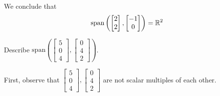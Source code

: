 \documentclass{ximera}
\begin{document}
\begin{example}
\begin{explanation}
We conclude that $$\mbox{span}\left(\begin{bmatrix}2\\2\end{bmatrix}, \begin{bmatrix}-1\\0\end{bmatrix}\right)=\mathbb{R}^2$$
\end{explanation}
\end{example}

\begin{example}\label{ex:spanoftwovectors}
Describe $\mbox{span}\left(\begin{bmatrix}5\\0\\4\end{bmatrix}, \begin{bmatrix}0\\4\\2\end{bmatrix}\right)$.
\begin{explanation}
First, observe that $\begin{bmatrix}5\\0\\4\end{bmatrix}, \begin{bmatrix}0\\4\\2\end{bmatrix}$ are not scalar multiples of each other.  

\begin{center}
\end{center}


\end{explanation}
\end{example}
\end{document}
